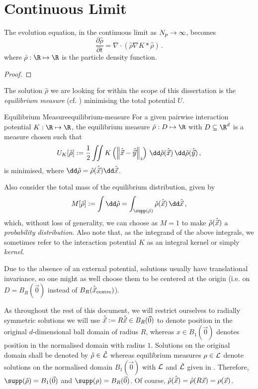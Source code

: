 \section{Continuous Limit}
The evolution equation, in the continuous limit as $N_p \rightarrow \infty$, becomes
\begin{equation}
  \frac{\partial \hat{\rho}}{\partial t} = \nabla \cdot \left(\hat{\rho} \nabla K * \hat{\rho}\right)\,.
  \label{eq:continuous-evolution-equation}
\end{equation}
where $\hat{\rho}: \R \mapsto \R$ is the particle density function.
\begin{proof}
  \hierKoennteIhreWerbungStehen
\end{proof}
The solution $\hat{\rho}$ we are looking for within the scope of this dissertation is the \textit{equilibrium measure} (cf. ) minimising the total potential $U$.

\begin{definition}{Equilibrium Measure}{equilibrium-measure}
  For a given pairwise interaction potential $K: \R \mapsto \R$, the equilibrium measure $\hat{\rho}: D \mapsto \R$ with $D \subseteq \R^d$ is a measure chosen such that
  $$U_K[\hat{\rho}] := \frac{1}{2} \iint K\left(\norm{\hatvec{x} - \hatvec{y}}\right) \,\dd\hat{\rho}(\hatvec{x})\,\dd\hat{\rho}(\hatvec{y})\,,$$
  is minimised, where $\dd\hat{\rho} = \hat{\rho}(\hatvec{x})\dd\hatvec{x}$.
\end{definition}
Also consider the total mass of the equilibrium distribution, given by
\begin{equation}
  M[\hat{\rho}] := \int \dd\hat{\rho} = \int_{\supp(\hat{\rho})} \hat{\rho}(\hatvec{x}) \,\dd\hatvec{x}\,,
  \label{eq:measure-mass}
\end{equation}
which, without loss of generality, we can choose as $M = 1$ to make $\hat{\rho}(\hat{\vec{x}})$ a \textit{probability distribution}.
Also note that, as the integrand of the above integrals, we sometimes refer to the interaction potential $K$ as an integral kernel or simply \textit{kernel}.

Due to the absence of an external potential, solutions usually have translational invariance, so one might as well choose them to be centered at the origin (i.e. on $D = B_R(\vec{0})$ instead of $B_R(\hat{\vec{x}}_{\text{centre}})$).

As throughout the rest of this document, we will restrict ourselves to radially symmetric solutions we will use $\hat{\vec{x}} := R\hat{\vec{x}} \in B_R(\vec{0})$ to denote position in the original $d$-dimensional ball domain of radius $R$, whereas $x \in B_1(\vec{0})$ denotes position in the normalised domain with radius $1$.
Solutions on the original domain shall be denoted by $\hat{\rho} \in \hat{\mathcal{L}}$ whereas equilibrium measures $\rho \in \mathcal{L}$ denote solutions on the normalised domain $B_1(\vec{0})$ with $\mathcal{L}$ and $\hat{\mathcal{L}}$ given in .
Therefore, $\supp(\hat{\rho}) = B_1(\vec{0})$ and $\supp(\rho) = B_R(\vec{0})$.
Of course, $\hat{\rho}(\hat{\vec{x}}) = \hat{\rho}(R\vec{x}) = \rho(\vec{x})$.


